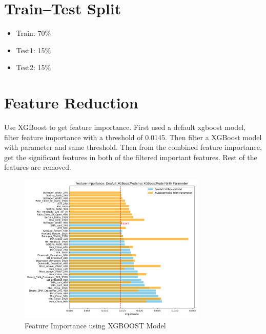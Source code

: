 \documentclass[11pt]{article}
\begin{document}
\section{Train--Test Split}
\begin{itemize}
    \item Train: 70\%
    \item Test1: 15\%
    \item Test2: 15\%
\end{itemize}
\newpage

\section{Feature Reduction}
Use XGBoost to get feature importance. First used a default xgboost model, filter feature importance with a threshold of 0.0145. Then filter a XGBoost model with parameter and same threshold. Then from the combined feature importance, get the significant features in both of the filtered important features. Rest of the features are removed.
\begin{figure}[ht]
    \centering
    \includegraphics[width=0.8\textwidth]{AMZN/feature_importance_comparison.png}
    \caption{Feature Importance using XGBOOST Model}
    \label{fig:feature_importance}
\end{figure}
\newpage
\end{document}
